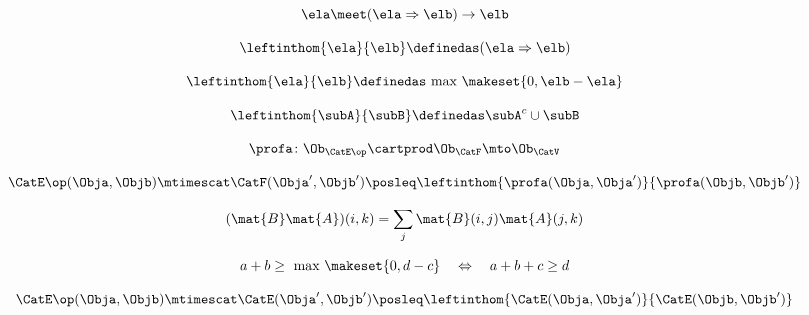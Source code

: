 {\begin{forslides}
        \begin{equation}
            \label{eq:slides_enrichment_62}
            \ela \meet (\ela \Rightarrow \elb) \rightarrow \elb
        \end{equation}

        \begin{equation}
            \label{eq:slides_enrichment_63}
            \leftinthom{\ela}{\elb} \definedas (\ela \Rightarrow \elb)
        \end{equation}

        \begin{equation}
            \label{eq:slides_enrichment_64}
            \leftinthom{\ela}{\elb} \definedas \text{ max } \makeset{0, \elb - \ela}
        \end{equation}

        \begin{equation}
            \label{eq:slides_enrichment_65}
            \leftinthom{\subA}{\subB} \definedas \subA^{c} \cup \subB
        \end{equation}

        \begin{equation}
            \label{eq:slides_enrichment_66}
            \profa \colon \Ob_{\CatE\op} \cartprod \Ob_{\CatF} \mto \Ob_\CatV
        \end{equation}

        \begin{equation}
            \label{eq:slides_enrichment_67}
            \CatE\op(\Obja, \Objb) \mtimescat \CatF(\Obja', \Objb') \posleq \leftinthom{\profa(\Obja, \Obja')}{\profa(\Objb, \Objb')}
        \end{equation}

        \begin{equation}
            \label{eq:slides_enrichment_68}
            (\mat{B} \mat{A})(i, k) = \sum_{j} \mat{B}(i,j) \mat{A}(j,k)
        \end{equation}

        \begin{equation}
            \label{eq:slides_enrichment_69}
            a + b \geq \text{ max } \makeset{0, d - c} \quad \Leftrightarrow \quad a + b + c \geq d
        \end{equation}

        \begin{equation}
            \label{eq:slides_enrichment_70}
            \CatE\op(\Obja, \Objb) \mtimescat \CatE(\Obja', \Objb') \posleq \leftinthom{\CatE(\Obja, \Obja')}{\CatE(\Objb, \Objb')}
        \end{equation}


\end{forslides}}
